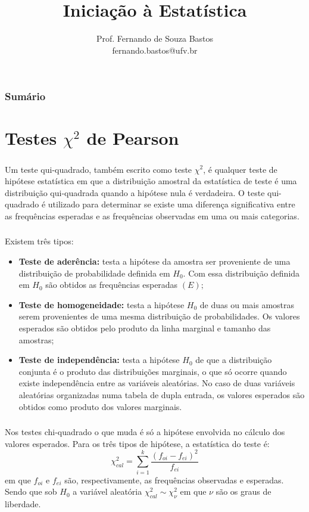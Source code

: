 \documentclass[14pt,aspectratio=1610]{beamer}
\title{Iniciação à Estatística}
\author{Prof. Fernando de Souza Bastos \texorpdfstring{\\ fernando.bastos@ufv.br}{}}
\institute{Departamento de Estatística \texorpdfstring{\\ Universidade Federal de Viçosa}{}\texorpdfstring{\\ Campus UFV - Viçosa}{}}
\date{}
\newcommand{\Ho}{\ensuremath{H_{0}}}
\begin{document}
%

\frame{\titlepage}

\begin{frame}{}
\frametitle{\bf Sumário}
\tableofcontents
\end{frame}

\section{Testes $\chi^{2}$ de Pearson}
\begin{frame}{}
\frametitle{}
\begin{block}{}
\justifying
Um teste qui-quadrado, também escrito como teste $\chi^{2}$, é qualquer teste de hipótese estatística em que a distribuição amostral da estatística de teste é uma distribuição qui-quadrada quando a hipótese nula é verdadeira. O teste qui-quadrado é utilizado para determinar se existe uma diferença significativa entre as frequências esperadas e as frequências observadas em uma ou mais categorias.
\end{block}
\end{frame}

\begin{frame}{}
\frametitle{}
\begin{block}{}
\justifying
Existem três tipos:
\begin{itemize}
\item {\bf Teste de aderência:} testa a hipótese da amostra ser proveniente de uma distribuição de probabilidade definida em $\Ho.$ Com essa distribuição definida em $\Ho$ são obtidos as frequências esperadas $(E);$\pause
\item {\bf Teste de homogeneidade:} testa a hipótese $\Ho$ de duas ou mais amostras serem provenientes de uma mesma distribuição de probabilidades. Os valores esperados são obtidos pelo produto da linha marginal e tamanho das amostras;\pause
\item {\bf Teste de independência:} testa a hipótese $\Ho$ de que a distribuição conjunta é o produto das distribuições marginais, o que só ocorre quando existe independência entre as variáveis aleatórias. No caso de duas variáveis aleatórias organizadas numa tabela de dupla entrada, os valores esperados são obtidos como produto dos valores marginais.
\end{itemize}
\end{block}
\end{frame}

\begin{frame}{}
\frametitle{}
\begin{block}{}
\justifying
Nos testes chi-quadrado o que muda é só a hipótese envolvida no cálculo dos valores esperados. Para os três tipos de hipótese, a estatística do teste é:
$$\chi^{2}_{cal}={\displaystyle \sum_{i=1}^{k}\dfrac{(f_{oi}-f_{ei})^{2}}{f_{ei}}}$$
em que $f_{oi}$ e $f_{ei}$ são, respectivamente, as frequências observadas e esperadas. Sendo que sob $\Ho$ a variável aleatória $\chi^{2}_{cal}\sim \chi^{2}_{\nu}$ em que $\nu$ são os graus de liberdade.

\end{block}
\end{frame}
\end{document}
